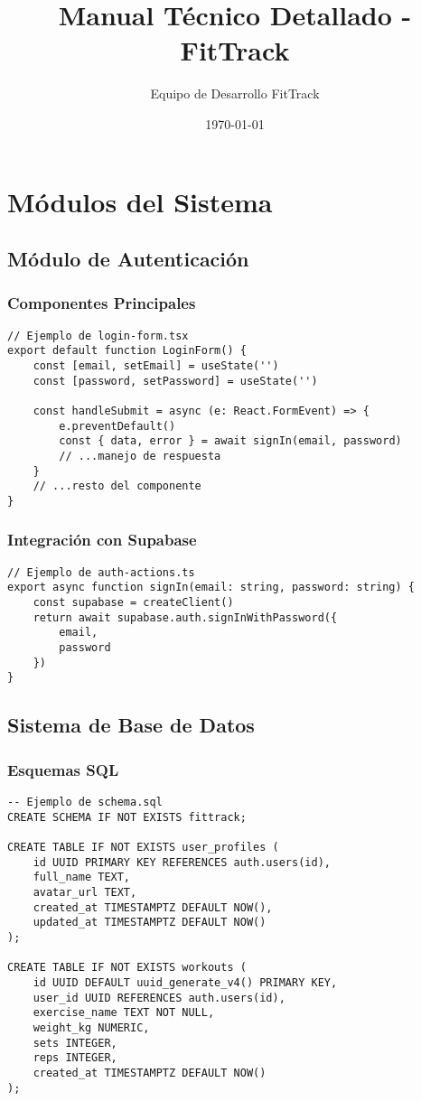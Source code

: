 \documentclass[12pt,a4paper]{report}
\title{Manual Técnico Detallado - FitTrack}
\author{Equipo de Desarrollo FitTrack}
\date{\today}
\begin{document}
\maketitle
\tableofcontents

\chapter{Módulos del Sistema}

\section{Módulo de Autenticación}
\subsection{Componentes Principales}
\begin{verbatim}
// Ejemplo de login-form.tsx
export default function LoginForm() {
    const [email, setEmail] = useState('')
    const [password, setPassword] = useState('')
    
    const handleSubmit = async (e: React.FormEvent) => {
        e.preventDefault()
        const { data, error } = await signIn(email, password)
        // ...manejo de respuesta
    }
    // ...resto del componente
}
\end{verbatim}

\subsection{Integración con Supabase}
\begin{verbatim}
// Ejemplo de auth-actions.ts
export async function signIn(email: string, password: string) {
    const supabase = createClient()
    return await supabase.auth.signInWithPassword({
        email,
        password
    })
}
\end{verbatim}

\section{Sistema de Base de Datos}
\subsection{Esquemas SQL}
\begin{verbatim}
-- Ejemplo de schema.sql
CREATE SCHEMA IF NOT EXISTS fittrack;

CREATE TABLE IF NOT EXISTS user_profiles (
    id UUID PRIMARY KEY REFERENCES auth.users(id),
    full_name TEXT,
    avatar_url TEXT,
    created_at TIMESTAMPTZ DEFAULT NOW(),
    updated_at TIMESTAMPTZ DEFAULT NOW()
);

CREATE TABLE IF NOT EXISTS workouts (
    id UUID DEFAULT uuid_generate_v4() PRIMARY KEY,
    user_id UUID REFERENCES auth.users(id),
    exercise_name TEXT NOT NULL,
    weight_kg NUMERIC,
    sets INTEGER,
    reps INTEGER,
    created_at TIMESTAMPTZ DEFAULT NOW()
);
\end{verbatim}
\end{document}
